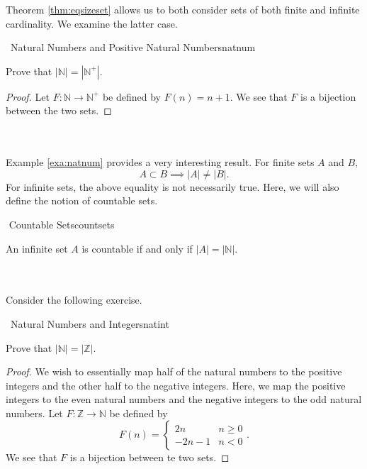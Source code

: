         Theorem \ref{thm:eqsizeset} allows us to both consider sets of both finite and infinite cardinality. We examine the latter case.
        \begin{example}{\Difficulty\,\Difficulty\,\,Natural Numbers and Positive Natural Numbers}{natnum}
        
            Prove that \(|\mathbb{N}|=|\mathbb{N}^+|\).
            \begin{proof}
                Let \(F:\mathbb{N}\to\mathbb{N}^+\) be defined by \(F(n)=n+1\). We see that \(F\) is a bijection between the two sets.
            \end{proof}
        
        \end{example}
        \vphantom
        \\
        \\
        Example \ref{exa:natnum} provides a very interesting result. For finite sets \(A\) and \(B\), 
        \begin{equation*}
            A\subset B \implies |A|\neq|B|.
        \end{equation*}
        For infinite sets, the above equality is not necessarily true. Here, we will also define the notion of countable sets.
        \begin{definition}{\Stop\,\,Countable Sets}{countsets}
            
            An infinite set \(A\) is countable if and only if \(|A|=|\mathbb{N}|\).
            
        \end{definition}
        \pagebreak
        \vphantom
        \\
        \\
        Consider the following exercise.
        \begin{exercise}{\Difficulty\,\Difficulty\,\,Natural Numbers and Integers}{natint}
        
            Prove that \(|\mathbb{N}|=|\mathbb{Z}|\).
            \begin{proof}
                We wish to essentially map half of the natural numbers to the positive integers and the other half to the negative integers. Here, we map the positive integers to the even natural numbers and the negative integers to the odd natural numbers. Let \(F:\mathbb{Z}\to\mathbb{N}\) be defined by 
                \begin{equation*}
                    F(n)=\begin{cases} 2n & n\geq 0 \\ -2n-1 & n<0\end{cases}.
                \end{equation*}
                We see that \(F\) is a bijection between te two sets.
            \end{proof}
        
        \end{exercise}
